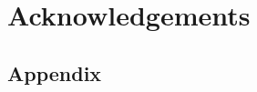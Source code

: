 \documentclass{llncs}
\begin{document}
\section*{Acknowledgements}


 
%

\begin{appendices}
\section*{Appendix}


\end{appendices}
\end{document}
